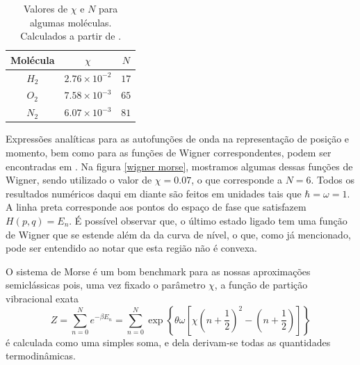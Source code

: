 \documentclass[
	12pt,
	oneside,			%
	a4paper,			%
	english,			%
	brazil				%
	]{abntex2}
\theoremstyle{definition}
\begin{document}
\begin{table}[H]
    \centering
    \begin{tabular}{ |c|c|c|  }
  \hline
 Molécula  & $\chi$ & $N$ \\
 \hline
 \hline
 $H_2$   & $2.76 \times 10^{-2}$ & $17$\\
 \hline
 $O_2$&   $7.58 \times 10^{-3}$  & $65$  \\
 \hline
 $N_2$ & $6.07 \times 10^{-3}$  & $81$\\
 \hline
\end{tabular}
    \caption{Valores de $\chi$ e $N$ para algumas moléculas. Calculados a partir de \cite{haynes2016crc}.}
    \label{dados moleculares}
\end{table}
Expressões analíticas para as autofunções de onda na representação de posição e momento, bem como para as funções de Wigner correspondentes, podem ser encontradas em \cite{dahl1988morse}. Na figura \ref{wigner morse}, mostramos algumas dessas funções de Wigner, sendo utilizado o valor de $\chi = 0.07$, o que corresponde a $N=6$. Todos os resultados numéricos daqui em diante são feitos em unidades tais que $\hbar = \omega = 1$. A linha preta corresponde aos pontos do espaço de fase que satisfazem $H(p,q) = E_n$. É possível observar que, o último estado ligado tem uma função de Wigner que se estende além da da curva de nível, o que, como já mencionado, pode ser entendido ao notar que esta região não é convexa.

O sistema de Morse é um bom benchmark para as nossas aproximações semiclássicas pois, uma vez fixado o parâmetro $\chi$, a função de partição vibracional exata
\begin{equation}
    Z = \sum_{n=0}^{N} e^{-\beta E_n} = \sum_{n=0}^{N} \exp\left\{ \theta  \omega \left[  \chi \left( n + \frac{1}{2} \right)^2 - \left( n + \frac{1}{2} \right)  \right]  \right\}
\end{equation}
é calculada como uma simples soma, e dela derivam-se todas as quantidades termodinâmicas.
\end{document}
